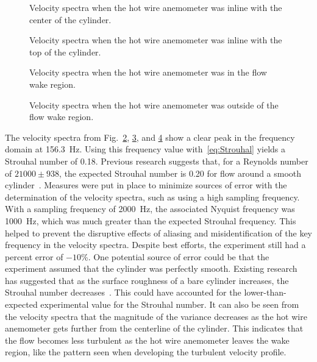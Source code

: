 \documentclass[journal,letterpaper]{IEEEtran}
\begin{document}
\begin{figure}[H]
    \centering
    
    \caption{Velocity spectra when the hot wire anemometer was inline with the center of the cylinder.}
    \label{fig:freq2}
\end{figure}

\begin{figure}[H]
    \centering
    
    \caption{Velocity spectra when the hot wire anemometer was inline with the top of the cylinder.}
    \label{fig:freq3}
\end{figure}

\begin{figure}[H]
    \centering
    
    \caption{Velocity spectra when the hot wire anemometer was in the flow wake region.}
    \label{fig:freq4}
\end{figure}

\begin{figure}[H]
    \centering
    
    \caption{Velocity spectra when the hot wire anemometer was outside of the flow wake region.}
    \label{fig:freq5}
\end{figure}

The velocity spectra from Fig.~\ref{fig:freq3}, \ref{fig:freq4}, and \ref{fig:freq5} show a clear peak in the frequency domain at \qty{156.3}{\hertz}.
Using this frequency value with~\eqref{eq:Strouhal} yields a Strouhal number of 0.18.
Previous research suggests that, for a Reynolds number of $21000 \pm 938$, the expected Strouhal number is 0.20 for flow around a smooth cylinder~\cite{Strouhal}.
Measures were put in place to minimize sources of error with the determination of the velocity spectra, such as using a high sampling frequency.
With a sampling frequency of \qty{2000}{\hertz}, the associated Nyquist frequency was \qty{1000}{\hertz}, which was much greater than the expected Strouhal frequency.
This helped to prevent the disruptive effects of aliasing and misidentification of the key frequency in the velocity spectra.
Despite best efforts, the experiment still had a percent error of $-10$\%.
One potential source of error could be that the experiment assumed that the cylinder was perfectly smooth.
Existing research has suggested that as the surface roughness of a bare cylinder increases, the Strouhal number decreases~\cite{roughness}.
This could have accounted for the lower-than-expected experimental value for the Strouhal number.
It can also be seen from the velocity spectra that the magnitude of the variance decreases as the hot wire anemometer gets further from the centerline of the cylinder.
This indicates that the flow becomes less turbulent as the hot wire anemometer leaves the wake region, like the pattern seen when developing the turbulent velocity profile.
\end{document}
